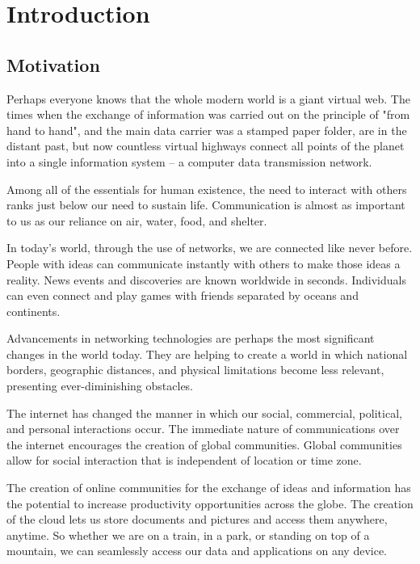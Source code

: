 \chapter{Introduction}\label{ch:intro}
\section{Motivation}
 Perhaps everyone knows that the whole modern world is a giant virtual web. The times when the exchange of information was carried out on the principle of "from hand to hand", and the main data carrier was a stamped paper folder, are in the distant past, but now countless virtual highways connect all points of the planet into a single information system – a computer data transmission network.         
  
  Among all of the essentials for human existence, the need to interact with others ranks just below our need to sustain life. Communication is almost as important to us as our reliance on air, water, food, and shelter.

   In today’s world, through the use of networks, we are connected like never before. People with ideas can communicate instantly with others to make those ideas a reality. News events and discoveries are known worldwide in seconds. Individuals can even connect and play games with friends separated by oceans and continents.

   Advancements in networking technologies are perhaps the most significant changes in the world today. They are helping to create a world in which national borders, geographic distances, and physical limitations become less relevant, presenting ever-diminishing obstacles.

   The internet has changed the manner in which our social, commercial, political, and personal interactions occur. The immediate nature of communications over the internet encourages the creation of global communities. Global communities allow for social interaction that is independent of location or time zone.
   
   The creation of online communities for the exchange of ideas and information has the potential to increase productivity opportunities across the globe.
   The creation of the cloud lets us store documents and pictures and access them anywhere, anytime. So whether we are on a train, in a park, or standing on top of a mountain, we can seamlessly access our data and applications on any device.
 
